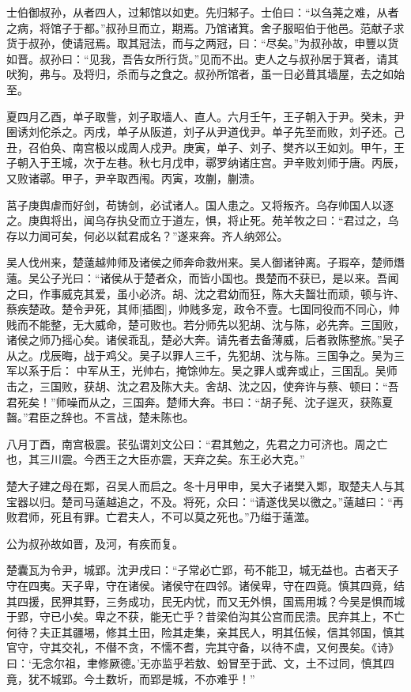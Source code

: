 \documentclass[a4paper,12pt,UTF8,twoside]{ctexbook}
\begin{document}
士伯御叔孙，从者四人，过邾馆以如吏。先归邾子。士伯曰：“以刍荛之难，从者之病，将馆子于都。”叔孙旦而立，期焉。乃馆诸箕。舍子服昭伯于他邑。范献子求货于叔孙，使请冠焉。取其冠法，而与之两冠，曰：“尽矣。”为叔孙故，申豐以货如晋。叔孙曰：“见我，吾告女所行货。”见而不出。吏人之与叔孙居于箕者，请其吠狗，弗与。及将归，杀而与之食之。叔孙所馆者，虽一日必葺其墙屋，去之如始至。

夏四月乙酉，单子取訾，刘子取墙人、直人。六月壬午，王子朝入于尹。癸未，尹圉诱刘佗杀之。丙戌，单子从阪道，刘子从尹道伐尹。单子先至而败，刘子还。己丑，召伯奂、南宫极以成周人戍尹。庚寅，单子、刘子、樊齐以王如刘。甲午，王子朝入于王城，次于左巷。秋七月戊申，鄩罗纳诸庄宫。尹辛败刘师于唐。丙辰，又败诸鄩。甲子，尹辛取西闱。丙寅，攻蒯，蒯溃。

莒子庚舆虐而好剑，苟铸剑，必试诸人。国人患之。又将叛齐。乌存帅国人以逐之。庚舆将出，闻乌存执殳而立于道左，惧，将止死。苑羊牧之曰：“君过之，乌存以力闻可矣，何必以弑君成名？”遂来奔。齐人纳郊公。

吴人伐州来，楚薳越帅师及诸侯之师奔命救州来。吴人御诸钟离。子瑕卒，楚师熸薳。吴公子光曰：“诸侯从于楚者众，而皆小国也。畏楚而不获已，是以来。吾闻之曰，作事威克其爱，虽小必济。胡、沈之君幼而狂，陈大夫齧壮而顽，顿与许、蔡疾楚政。楚令尹死，其师[插图]，帅贱多宠，政令不壹。七国同役而不同心，帅贱而不能整，无大威命，楚可败也。若分师先以犯胡、沈与陈，必先奔。三国败，诸侯之师乃摇心矣。诸侯乖乱，楚必大奔。请先者去备薄威，后者敦陈整旅。”吴子从之。戊辰晦，战于鸡父。吴子以罪人三千，先犯胡、沈与陈。三国争之。吴为三军以系于后： 中军从王，光帅右，掩馀帅左。吴之罪人或奔或止，三国乱。吴师击之，三国败，获胡、沈之君及陈大夫。舍胡、沈之囚，使奔许与蔡、顿曰：“吾君死矣！”师噪而从之，三国奔。楚师大奔。书曰：“胡子髡、沈子逞灭，获陈夏齧。”君臣之辞也。不言战，楚未陈也。

八月丁酉，南宫极震。苌弘谓刘文公曰：“君其勉之，先君之力可济也。周之亡也，其三川震。今西王之大臣亦震，天弃之矣。东王必大克。”

楚大子建之母在郹，召吴人而启之。冬十月甲申，吴大子诸樊入郹，取楚夫人与其宝器以归。楚司马薳越追之，不及。将死，众曰：“请遂伐吴以徼之。”薳越曰：“再败君师，死且有罪。亡君夫人，不可以莫之死也。”乃缢于薳澨。

公为叔孙故如晋，及河，有疾而复。

楚囊瓦为令尹，城郢。沈尹戌曰：“子常必亡郢，苟不能卫，城无益也。古者天子守在四夷。天子卑，守在诸侯。诸侯守在四邻。诸侯卑，守在四竟。慎其四竟，结其四援，民狎其野，三务成功，民无内忧，而又无外惧，国焉用城？今吴是惧而城于郢，守已小矣。卑之不获，能无亡乎？昔梁伯沟其公宫而民溃。民弃其上，不亡何待？夫正其疆埸，修其土田，险其走集，亲其民人，明其伍候，信其邻国，慎其官守，守其交礼，不僣不贪，不懦不耆，完其守备，以待不虞，又何畏矣。《诗》曰：‘无念尔祖，聿修厥德。’无亦监乎若敖、蚡冒至于武、文，土不过同，慎其四竟，犹不城郢。今土数圻，而郢是城，不亦难乎！”
\end{document}
